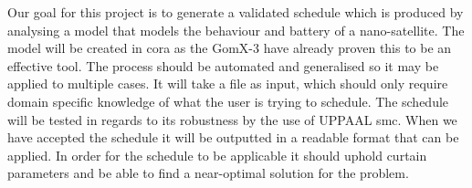 Our goal for this project is to generate a validated schedule which is produced by analysing a model that models the behaviour and battery of a nano-satellite. 
The model will be created in \gls{cora} as the GomX-3\cite{gomx3} have already proven this to be an effective tool. The process should be automated and generalised so it may be applied to multiple cases. 
It will take a file as input, which should only require domain specific knowledge of what the user is trying to schedule. 
The schedule will be tested in regards to its robustness by the use of UPPAAL \gls{smc}. 
When we have accepted the schedule it will be outputted in a readable format that can be applied. 
In order for the schedule to be applicable it should uphold curtain parameters and be able to find a near-optimal solution for the problem.
\glsresetall




